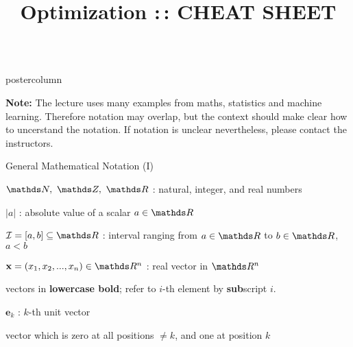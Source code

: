 \documentclass{beamer}
\title{Optimization :\,: CHEAT SHEET} %
\newlength{\columnheight} %
\begin{document}
\begin{frame}[fragile]{}
\begin{columns}
	\begin{column}{.31\textwidth}
		\begin{beamercolorbox}[center]{postercolumn}
			\begin{minipage}{.98\textwidth}
				\parbox[t][\columnheight]{\textwidth}{
					\vspace{1cm}
					\textbf{Note: } The lecture uses many examples from maths, statistics and machine learning. Therefore notation may overlap, but the context should make clear how to uncerstand the notation. 
					If notation is unclear nevertheless, please contact the instructors.
					\begin{myblock}{General Mathematical Notation (I)}
						\begin{codebox}
							$\N, ~\Z, ~\R$ : natural, integer, and real numbers
						\end{codebox}
						\hspace*{1ex}%
						\begin{codebox}
						    $|a|$ : absolute value of a scalar $a \in \R$
						\end{codebox}
						\hspace*{1ex}
						\begin{codebox}
							 $\mathcal{I} = [a, b] \subseteq \R$ : interval ranging from $a \in \R$ to $b \in \R$, $a < b$
						\end{codebox}
						\hspace*{1ex}
						\begin{codebox}
						    $\xv = (x_1, x_2, ..., x_n) \in \R^n$ :  real vector in $\R^n$ %
						\end{codebox}
						\hspace*{1ex} vectors in \textbf{lowercase bold}; refer to $i$-th element by \textbf{sub}script $i$.
						\\
						\begin{codebox}
							$\mathbf{e}_k$ : $k$-th unit vector
						\end{codebox}
						\hspace*{1ex} vector which is zero at all positions $\neq k$, and one at position $k$ \\

\end{myblock}}
\end{minipage}
\end{beamercolorbox}
\end{column}
\end{columns}
\end{frame}
\end{document}
